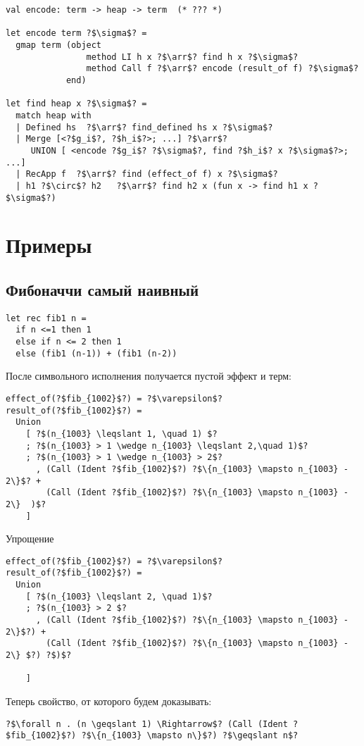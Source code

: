 \documentclass{article}
\newcommand*{\arr}{\ensuremath{\rightarrow}}
\begin{document}
\begin{verbatim}  
val encode: term -> heap -> term  (* ??? *)

let encode term ?$\sigma$? = 
  gmap term (object 
                method LI h x ?$\arr$? find h x ?$\sigma$? 
                method Call f ?$\arr$? encode (result_of f) ?$\sigma$? 
            end)

let find heap x ?$\sigma$? =
  match heap with 
  | Defined hs  ?$\arr$? find_defined hs x ?$\sigma$? 
  | Merge [<?$g_i$?, ?$h_i$?>; ...] ?$\arr$? 
     UNION [ <encode ?$g_i$? ?$\sigma$?, find ?$h_i$? x ?$\sigma$?>; ...]
  | RecApp f  ?$\arr$? find (effect_of f) x ?$\sigma$?
  | h1 ?$\circ$? h2   ?$\arr$? find h2 x (fun x -> find h1 x ?$\sigma$?)
\end{verbatim}

\section{Примеры}
\subsection{Фибоначчи самый наивный}
\begin{verbatim}  
let rec fib1 n = 
  if n <=1 then 1
  else if n <= 2 then 1
  else (fib1 (n-1)) + (fib1 (n-2))
\end{verbatim}

После символьного исполнения получается пустой эффект и терм:
\begin{verbatim}
effect_of(?$fib_{1002}$?) = ?$\varepsilon$?
result_of(?$fib_{1002}$?) = 
  Union 
    [ ?$(n_{1003} \leqslant 1, \quad 1) $?
    ; ?$(n_{1003} > 1 \wedge n_{1003} \leqslant 2,\quad 1)$?
    ; ?$(n_{1003} > 1 \wedge n_{1003} > 2$?
      , (Call (Ident ?$fib_{1002}$?) ?$\{n_{1003} \mapsto n_{1003} - 2\}$? +
        (Call (Ident ?$fib_{1002}$?) ?$\{n_{1003} \mapsto n_{1003} - 2\}  )$?   
    ]
\end{verbatim}
Упрощение
\begin{verbatim}
effect_of(?$fib_{1002}$?) = ?$\varepsilon$?
result_of(?$fib_{1002}$?) = 
  Union 
    [ ?$(n_{1003} \leqslant 2, \quad 1)$?
    ; ?$(n_{1003} > 2 $?
      , (Call (Ident ?$fib_{1002}$?) ?$\{n_{1003} \mapsto n_{1003} - 2\}$?) +
        (Call (Ident ?$fib_{1002}$?) ?$\{n_{1003} \mapsto n_{1003} - 2\} $?) ?$)$?

    ]
\end{verbatim}
Теперь свойство, от которого будем доказывать: 
\begin{verbatim}
?$\forall n . (n \geqslant 1) \Rightarrow$? (Call (Ident ?$fib_{1002}$?) ?$\{n_{1003} \mapsto n\}$?) ?$\geqslant n$?
\end{verbatim}
\end{document}
